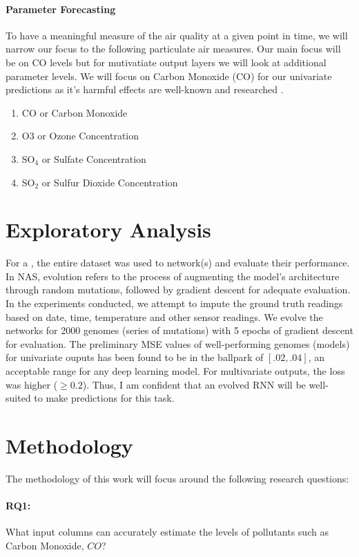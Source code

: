\documentclass[12pt]{article}
\begin{document}
\paragraph{Parameter Forecasting} To have a meaningful measure of the air quality at a given point in time, we will narrow our focus to the following particulate air measures. Our main focus will be on CO levels but for mutivatiate output layers we will look at additional parameter levels. We will focus on Carbon Monoxide (CO) for our univariate predictions as it's harmful effects are well-known and researched \cite{rose2017carbon}.
\begin{enumerate}
    \item
        CO or Carbon Monoxide
    \item
        O3 or Ozone Concentration
    \item
        SO$_{4}$ or Sulfate Concentration
    \item
        SO$_{2}$ or Sulfur Dioxide Concentration
\end{enumerate}

\section{Exploratory Analysis}
For a , the entire dataset was used to  network(s) and evaluate their performance. In NAS, evolution refers to the process of augmenting the model's architecture through random mutations, followed by gradient descent for adequate evaluation. In the experiments conducted, we attempt to impute the ground truth readings based on date, time, temperature and other sensor readings. We evolve the networks for 2000 genomes (series of mutations) with 5 epochs of gradient descent for evaluation. The preliminary MSE values of well-performing genomes (models) for univariate ouputs has been found to be in the ballpark of $[.02,.04]$, an acceptable range for any deep learning model. For multivariate outputs, the loss was higher ($\geq 0.2$). Thus, I am confident that an evolved RNN will be well-suited to make predictions for this task. 

\section{Methodology}
The methodology of this work will focus around the following research questions:
\paragraph{RQ1:} What input columns can accurately estimate the levels of pollutants such as Carbon Monoxide, $CO$? \\
\end{document}
